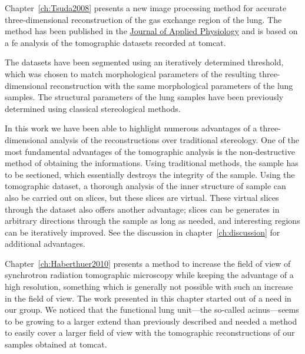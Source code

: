 Chapter~\ref{ch:Tsuda2008} presents a new image processing method for accurate three-dimensional reconstruction of the gas exchange region of the lung. The method has been  published in the \href{http://jap.physiology.org/}{Journal of Applied Physiology} and is based on a \ac{fe} analysis of the tomographic datasets recorded at \ac{tomcat}. 

The datasets have been segmented using an iteratively determined threshold, which was chosen to match morphological parameters of the resulting three-dimensional reconstruction with the same morphological parameters of the lung samples. The structural parameters of the lung samples have been previously determined using classical stereological methods.

In this work we have been able to highlight numerous advantages of a three-dimensional analysis of the reconstructions over traditional stereology. One of the most fundamental advantages of the tomographic analysis is the non-destructive method of obtaining the informations. Using traditional methods, the sample has to be sectioned, which essentially destroys the integrity of the sample. Using the tomographic dataset, a thorough analysis of the inner structure of sample can also be carried out on slices, but these slices are virtual. These virtual slices through the dataset also offers another advantage; slices can be generates in arbitrary directions through the sample as long as needed, and interesting regions can be iteratively improved. See the discussion in chapter~\ref{ch:discussion} for additional advantages.

Chapter~\ref{ch:Haberthuer2010} presents a method to increase the field of view of synchrotron radiation tomographic microscopy while keeping the advantage of a high resolution, something which is generally not possible with such an increase in the field of view. The work presented in this chapter started out of a need in our group. We noticed that the functional lung unit---the so-called acinus---seems to be growing to a larger extend than previously described  and needed a method to easily cover a larger field of view with the tomographic reconstructions of our samples obtained at \ac{tomcat}.

